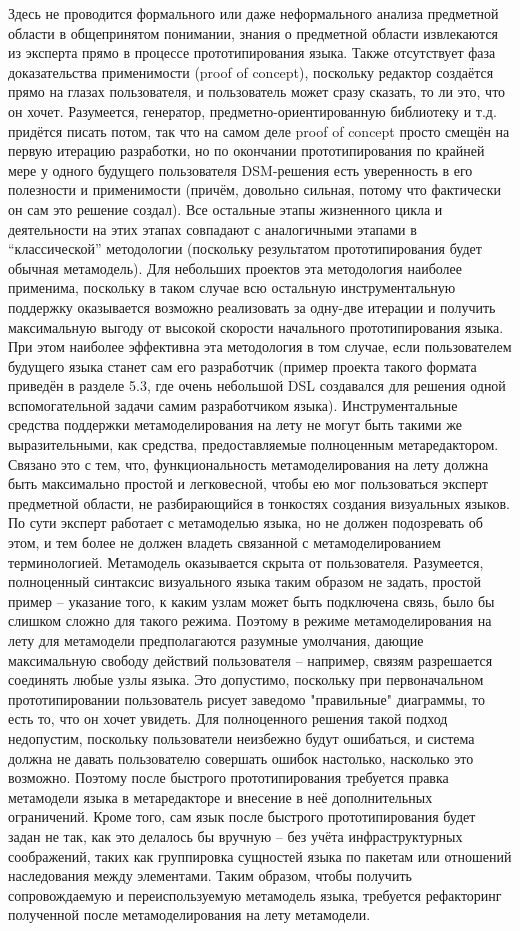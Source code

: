 	Здесь не проводится формального или даже неформального анализа предметной области в общепринятом понимании, знания о предметной области извлекаются из эксперта прямо в процессе прототипирования языка. Также отсутствует фаза доказательства применимости (proof of concept), поскольку редактор создаётся прямо на глазах пользователя, и пользователь может сразу сказать, то ли это, что он хочет. Разумеется, генератор, предметно-ориентированную библиотеку и т.д. придётся писать потом, так что на самом деле proof of concept просто смещён на первую итерацию разработки, но по окончании прототипирования по крайней мере у одного будущего пользователя DSM-решения есть уверенность в его полезности и применимости (причём, довольно сильная, потому что фактически он сам это решение создал).
	Все остальные этапы жизненного цикла и деятельности на этих этапах совпадают с аналогичными этапами в “классической” методологии (поскольку результатом прототипирования будет обычная метамодель). Для небольших проектов эта методология наиболее применима, поскольку в таком случае всю остальную инструментальную поддержку оказывается возможно реализовать за одну-две итерации и получить максимальную выгоду от высокой скорости начального прототипирования языка. При этом наиболее эффективна эта методология в том случае, если пользователем будущего языка станет сам его разработчик (пример проекта такого формата приведён в разделе 5.3, где очень небольшой DSL создавался для решения одной вспомогательной задачи самим разработчиком языка).
	Инструментальные средства поддержки метамоделирования на лету не могут быть такими же выразительными, как средства, предоставляемые полноценным метаредактором. Связано это с тем, что, функциональность метамоделирования на лету должна быть максимально простой и легковесной, чтобы ею мог пользоваться эксперт предметной области, не разбирающийся в тонкостях создания визуальных языков. По сути эксперт работает с метамоделью языка, но не должен подозревать об этом, и тем более не должен владеть связанной с метамоделированием терминологией. Метамодель оказывается скрыта от пользователя. Разумеется, полноценный синтаксис визуального языка таким образом не задать, простой пример – указание того, к каким узлам может быть подключена связь, было бы слишком сложно для такого режима. Поэтому в режиме метамоделирования на лету для метамодели предполагаются разумные умолчания, дающие максимальную свободу действий пользователя – например, связям разрешается соединять любые узлы языка. Это допустимо, поскольку при первоначальном прототипировании пользователь рисует заведомо "правильные" диаграммы, то есть то, что он хочет увидеть. Для полноценного решения такой подход недопустим, поскольку пользователи неизбежно будут ошибаться, и система должна не давать пользователю совершать ошибок настолько, насколько это возможно. Поэтому после быстрого прототипирования требуется правка метамодели языка в метаредакторе и внесение в неё дополнительных ограничений. Кроме того, сам язык после быстрого прототипирования будет задан не так, как это делалось бы вручную – без учёта инфраструктурных соображений, таких как группировка сущностей языка по пакетам или отношений наследования между элементами. Таким образом, чтобы получить сопровождаемую и переиспользуемую метамодель языка, требуется рефакторинг полученной после метамоделирования на лету метамодели.

